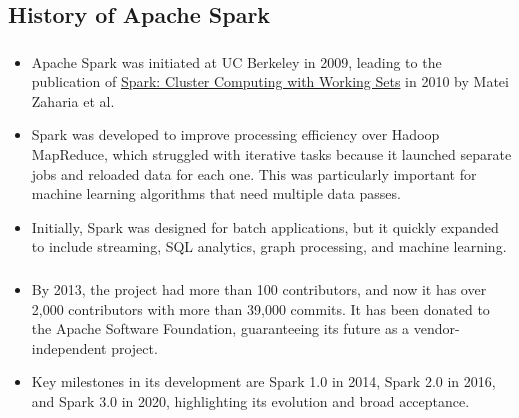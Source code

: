 \subsection{History of Apache Spark}\label{subsec:history-of-apache-spark}
\begin{frame}
    \frametitle{\subsecname}
    \begin{itemize}
        \item Apache Spark was initiated at UC Berkeley in 2009, leading to the publication of \href{https://www1.icsi.berkeley.edu/pubs/networking/ICSI_sparkclustercomputing10.pdf}{Spark: Cluster Computing with Working Sets} in 2010 by Matei Zaharia et al.  \pause
        \item Spark was developed to improve processing efficiency over Hadoop MapReduce, which struggled with iterative tasks because it launched separate jobs and reloaded data for each one. This was particularly important for machine learning algorithms that need multiple data passes. \pause
        \item Initially, Spark was designed for batch applications, but it quickly expanded to include streaming, SQL analytics, graph processing, and machine learning. \pause
    \end{itemize}
\end{frame}
\begin{frame}
    \frametitle{\subsecname}
    \begin{itemize}
        \item By 2013, the project had more than 100 contributors, and now it has over 2,000 contributors with more than 39,000 commits. It has been donated to the Apache Software Foundation, guaranteeing its future as a vendor-independent project. \pause
        \item Key milestones in its development are Spark 1.0 in 2014, Spark 2.0 in 2016, and Spark 3.0 in 2020, highlighting its evolution and broad acceptance. \pause
    \end{itemize}
\end{frame}

